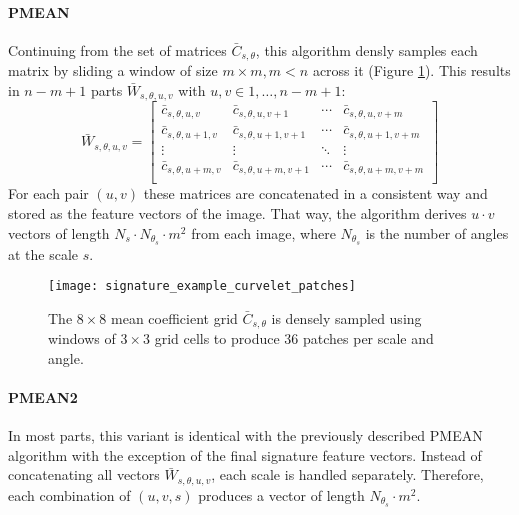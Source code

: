 \paragraph{PMEAN}

Continuing from the set of matrices $\bar{C}_{s, \theta}$, this algorithm
densly samples each matrix by sliding a window of size $m \times m, m < n$
across it (Figure \ref{fig:patch_examples}). This results in $n - m + 1$ parts
$\bar{W}_{s, \theta, u, v}$ with $u, v \in 1, \dots, n - m + 1$:
\begin{equation*}
    \bar{W}_{s,\theta,u,v} =
    \begin{bmatrix}
        \bar{c}_{s,\theta,u,v} & \bar{c}_{s,\theta,u,v+1} & \cdots & \bar{c}_{s,\theta,u,v+m} \\
        \bar{c}_{s,\theta,u+1,v} & \bar{c}_{s,\theta,u+1,v+1} & \cdots & \bar{c}_{s,\theta,u+1,v+m} \\
        \vdots  & \vdots  & \ddots & \vdots  \\
        \bar{c}_{s,\theta,u+m,v} & \bar{c}_{s,\theta,u+m,v+1} & \cdots & \bar{c}_{s,\theta,u+m,v+m} \\
    \end{bmatrix}
\end{equation*}
For each pair $(u, v)$ these matrices are concatenated in a consistent way and
stored as the feature vectors of the image. That way, the algorithm derives $u
\cdot v$ vectors of length $N_s \cdot N_{\theta_s} \cdot m^2$ from each image,
where $N_{\theta_s}$ is the number of angles at the scale $s$.

\begin{figure}[h]
    \centering
    \texttt{[image: signature\_example\_curvelet\_patches]}%
    \caption[Patches on a coefficient grid]{
        The $8 \times 8$ mean coefficient grid $\bar{C}_{s, \theta}$ is densely
        sampled using windows of $3 \times 3$ grid cells to produce $36$
        patches per scale and angle.
    }
    \label{fig:patch_examples}
\end{figure}

\paragraph{PMEAN2}

In most parts, this variant is identical with the previously described PMEAN
algorithm with the exception of the final signature feature vectors. Instead of
concatenating all vectors $\bar{W}_{s, \theta, u, v}$, each scale is handled
separately. Therefore, each combination of $(u, v, s)$ produces a vector of
length $N_{\theta_s} \cdot m^2$.


